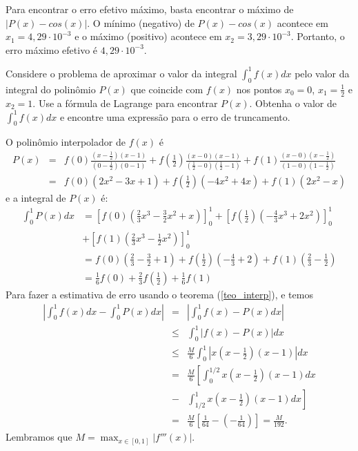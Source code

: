 \documentclass[main.tex]{subfiles}
\begin{document}
Para encontrar o erro efetivo máximo, basta encontrar o máximo de $|P(x)-cos(x)|$. O mínimo (negativo) de $P(x)-cos(x)$ acontece em $x_1=4,29\cdot 10^{-3}$ e o máximo (positivo) acontece em $x_2=3,29\cdot 10^{-3}$. Portanto, o erro máximo efetivo é $4,29\cdot 10^{-3}$.

\begin{ex}\label{exemp_simpson}
Considere o problema de aproximar o valor da integral $\int_0^1 f(x)dx$ pelo valor da integral do polinômio $P(x)$ que coincide com $f(x)$ nos pontos $x_0=0$, $x_1=\frac{1}{2}$ e $x_2=1$. Use a fórmula de Lagrange para encontrar $P(x)$. Obtenha o valor de $\int_0^1f(x)dx$ e encontre uma expressão para o erro de truncamento.
\end{ex}
O polinômio interpolador de $f(x)$ é
\begin{eqnarray*}
P(x)&=&f(0)\frac{(x-\frac{1}{2})(x-1)}{(0-\frac{1}{2})(0-1)}+f\left(\frac{1}{2}\right)\frac{(x-0)(x-1)}{(\frac{1}{2}-0)(\frac{1}{2}-1)}+f(1)\frac{(x-0)(x-\frac{1}{2})}{(1-0)(1-\frac{1}{2})}\\
&=&   f(0)(2x^2-3x+1)+f\left(\frac{1}{2}\right)(-4x^2+4x)+f(1)(2x^2-x)
\end{eqnarray*}
e a integral de $P(x)$ é:
\begin{align*}
\int_0^1 P(x)dx &= \left[f(0)\left(\frac{2}{3}x^3 - \frac{3}{2}x^2+x\right)\right]_0^1 + \left[f\left(\frac{1}{2}\right)\left(-\frac{4}{3}x^3+2x^2\right)\right]_0^1 \\
&+ \left[f(1)\left(\frac{2}{3}x^3-\frac{1}{2}x^2\right)\right]_0^1\\
&= f(0)\left(\frac{2}{3}-\frac{3}{2}+1\right)+f\left(\frac{1}{2}\right)\left(-\frac{4}{3}+2\right)+f(1)\left(\frac{2}{3}-\frac{1}{2}\right)\\
&= \frac{1}{6}f(0)+\frac{2}{3}f\left(\frac{1}{2}\right)+\frac{1}{6}f(1)
\end{align*}
Para fazer a estimativa de erro usando o teorema (\ref{teo_interp}), e temos
\begin{eqnarray*}
\left|\int_0^1f(x)dx-\int_0^1 P(x)dx\right|&=&\left|\int_0^1f(x)- P(x)dx\right|\\
&\leq&\int_0^1|f(x)- P(x)|dx\\
&\leq& \frac{M}{6}  \int_0^1\left|x\left(x-\frac{1}{2}\right)(x-1)\right|dx\\
&=& \frac{M}{6}  \left[\int_0^{1/2}x\left(x-\frac{1}{2}\right)(x-1)dx\right.\\
&-&\left.\int_{1/2}^1x\left(x-\frac{1}{2}\right)(x-1)dx\right]\\
&=& \frac{M}{6}  \left[\frac{1}{64}-\left(-\frac{1}{64}\right)\right]=\frac{M}{192}.
\end{eqnarray*}
Lembramos que $M=\max_{x\in[0,1]}|f'''(x)|$.
\end{document}
